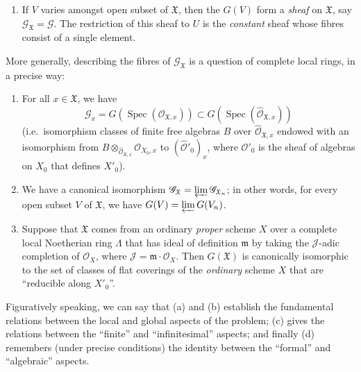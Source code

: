 \documentclass{article}
\providecommand{\tightlist}{%
  \setlength{\itemsep}{0pt}\setlength{\parskip}{0pt}}
\theoremstyle{definition}
\theoremstyle{definition}
\theoremstyle{definition}
\theoremstyle{definition}
\theoremstyle{remark}
\begin{document}
\begin{enumerate}
\def\labelenumi{\alph{enumi}.}
\tightlist
\item
  If \(V\) varies amongst open subset of \({\mathfrak{X}}\), then the \(G(V)\) form a \emph{sheaf} on \({\mathfrak{X}}\), say \({\mathscr{G}}_{\mathfrak{X}}={\mathscr{G}}\).
  The restriction of this sheaf to \(U\) is the \emph{constant} sheaf whose fibres consist of a single element.
\end{enumerate}

More generally, describing the fibres of \({\mathscr{G}}_{\mathfrak{X}}\) is a question of complete local rings, in a precise way:

\begin{enumerate}
\def\labelenumi{\alph{enumi}.}
\setcounter{enumi}{1}
\item
  For all \(x\in{\mathfrak{X}}\), we have
  \[
   {\mathscr{G}}_x = G(\operatorname{Spec}({\mathscr{O}}_{{\mathfrak{X}},x})) \subset G(\operatorname{Spec}(\widehat{{\mathscr{O}}}_{{\mathfrak{X}},x}))
    \]
  (i.e.~isomorphism classes of finite free algebras \(B\) over \(\widehat{{\mathscr{O}}}_{{\mathfrak{X}},x}\) endowed with an isomorphism from \(B\otimes_{\widehat{{\mathscr{O}}}_{{\mathfrak{X}},x}}{\mathscr{O}}_{X_0,x}\) to \((\widehat{{\mathscr{O}}}'_0)_x\), where \({\mathscr{O}}'_0\) is the sheaf of algebras on \(X_0\) that defines \(X'_0\)).
\item
  We have a canonical isomorphism \({\mathscr{G}}_{\mathfrak{X}}=\varprojlim{\mathscr{G}}_{{\mathfrak{X}}_n}\); in other words, for every open subset \(V\) of \({\mathfrak{X}}\), we have \(G(V)=\varprojlim G(V_n)\).
\item
  Suppose that \({\mathfrak{X}}\) comes from an ordinary \emph{proper} scheme \(X\) over a complete local Noetherian ring \(\Lambda\) that has ideal of definition \({\mathfrak{m}}\) by taking the \({\mathscr{J}}\)-adic completion of \({\mathscr{O}}_X\), where \({\mathscr{J}}={\mathfrak{m}}\cdot{\mathscr{O}}_X\).
  Then \(G({\mathfrak{X}})\) is canonically isomorphic to the set of classes of flat coverings of the \emph{ordinary} scheme \(X\) that are ``reducible along \(X'_0\)''.
\end{enumerate}

Figuratively speaking, we can say that (a) and (b) establish the fundamental relations between the local and global aspects of the problem; (c) gives the relations between the ``finite'' and ``infinitesimal'' aspects; and finally (d) remembers (under precise conditions) the identity between the ``formal'' and ``algebraic'' aspects.
\end{document}
